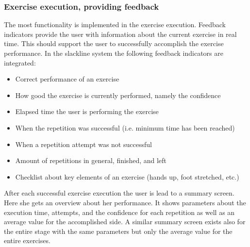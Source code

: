 \subsubsection{Exercise execution, providing feedback}
The most functionality is implemented in the exercise execution. Feedback indicators provide the user with information about the current exercise in real time. This should support the user to successfully accomplish the exercise performance. In the slackline system the following feedback indicators are integrated:

\begin{itemize}
\item Correct performance of an exercise
\item How good the exercise is currently performed, namely the confidence
\item Elapsed time the user is performing the exercise
\item When the repetition was successful (i.e. minimum time has been reached)
\item When a repetition attempt was not successful
\item Amount of repetitions in general, finished, and left
\item Checklist about key elements of an exercise (hands up, foot stretched, etc.)
\end{itemize}

After each successful exercise execution the user is lead to a summary screen. Here she gets an overview about her performance. It shows parameters about the execution time, attempts, and the confidence for each repetition as well as an average value for the accomplished side. A similar summary screen exists also for the entire stage with the same parameters but only the average value for the entire exercises.

